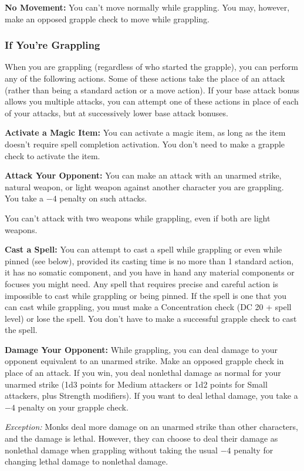 \textbf{No Movement:} You can't move normally while grappling. You may, however, make an opposed grapple check to move while grappling.

\subsubsection{If You're Grappling}
When you are grappling (regardless of who started the grapple), you can perform any of the following actions. Some of these actions take the place of an attack (rather than being a standard action or a move action). If your base attack bonus allows you multiple attacks, you can attempt one of these actions in place of each of your attacks, but at successively lower base attack bonuses.

\textbf{Activate a Magic Item:} You can activate a magic item, as long as the item doesn't require spell completion activation. You don't need to make a grapple check to activate the item.

\textbf{Attack Your Opponent:} You can make an attack with an unarmed strike, natural weapon, or light weapon against another character you are grappling. You take a $-4$ penalty on such attacks.

You can't attack with two weapons while grappling, even if both are light weapons.

\textbf{Cast a Spell:} You can attempt to cast a spell while grappling or even while pinned (see below), provided its casting time is no more than 1 standard action, it has no somatic component, and you have in hand any material components or focuses you might need. Any spell that requires precise and careful action is impossible to cast while grappling or being pinned. If the spell is one that you can cast while grappling, you must make a Concentration check (DC 20 + spell level) or lose the spell. You don't have to make a successful grapple check to cast the spell.

\textbf{Damage Your Opponent:} While grappling, you can deal damage to your opponent equivalent to an unarmed strike. Make an opposed grapple check in place of an attack. If you win, you deal nonlethal damage as normal for your unarmed strike (1d3 points for Medium attackers or 1d2 points for Small attackers, plus Strength modifiers). If you want to deal lethal damage, you take a $-4$ penalty on your grapple check.

\textit{Exception:} Monks deal more damage on an unarmed strike than other characters, and the damage is lethal. However, they can choose to deal their damage as nonlethal damage when grappling without taking the usual $-4$ penalty for changing lethal damage to nonlethal damage.

